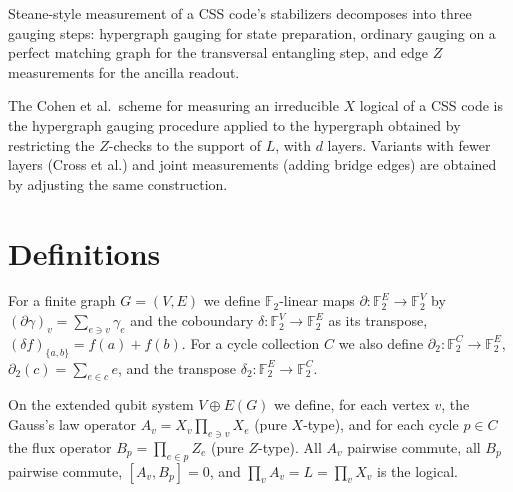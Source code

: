 \begin{remark}
\label{rem:25_steane_style_measurement}
\leanok
Steane-style measurement of a CSS code's stabilizers decomposes into three gauging steps:
hypergraph gauging for state preparation, ordinary gauging on a perfect matching graph for
the transversal entangling step, and edge $Z$ measurements for the ancilla readout.
\end{remark}

\begin{remark}
\label{rem:26_cohen_et_al_scheme_recovery}
\leanok
The Cohen et al.\ scheme for measuring an irreducible $X$ logical of a CSS code is the
hypergraph gauging procedure applied to the hypergraph obtained by restricting the $Z$-checks
to the support of $L$, with $d$ layers. Variants with fewer layers (Cross et al.) and joint
measurements (adding bridge edges) are obtained by adjusting the same construction.
\end{remark}

\chapter{Definitions}

\begin{definition}
\label{def:1_boundary_coboundary_maps}
\leanok
For a finite graph $G = (V, E)$ we define $\mathbb{F}_2$-linear maps
$\partial : \mathbb{F}_2^E \to \mathbb{F}_2^V$ by $(\partial \gamma)_v = \sum_{e \ni v} \gamma_e$
and the coboundary $\delta : \mathbb{F}_2^V \to \mathbb{F}_2^E$ as its transpose,
$(\delta f)_{\{a,b\}} = f(a) + f(b)$. For a cycle collection $C$ we also define
$\partial_2 : \mathbb{F}_2^C \to \mathbb{F}_2^E$, $\partial_2(c) = \sum_{e \in c} e$, and the
transpose $\delta_2 : \mathbb{F}_2^E \to \mathbb{F}_2^C$.
\end{definition}

\begin{definition}
\label{def:2_gauss_law_flux}
\leanok
On the extended qubit system $V \oplus E(G)$ we define, for each vertex $v$, the Gauss's law
operator $A_v = X_v \prod_{e \ni v} X_e$ (pure $X$-type), and for each cycle $p \in C$ the
flux operator $B_p = \prod_{e \in p} Z_e$ (pure $Z$-type). All $A_v$ pairwise commute, all
$B_p$ pairwise commute, $[A_v, B_p] = 0$, and $\prod_v A_v = L = \prod_v X_v$ is the logical.
\end{definition}

